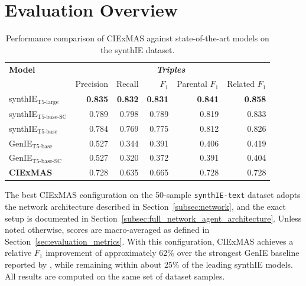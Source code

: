 \documentclass[a4paper,oneside,bibliography=totoc]{scrbook}
\begin{document}
\section{Evaluation Overview}
\label{sec:evaluation_overview}

\begin{table}[h]
  \centering
  \begin{tabular}{l|rrrrr}
    \toprule
    \textbf{Model}                & \multicolumn{5}{c}{\textit{\textbf{Triples}}}                                                                     \\
                                  & Precision                                     & Recall         & $F_1$          & Parental $F_1$ & Related $F_1$  \\
    \midrule
    synthIE$_{\text{T5-large}}$   & \textbf{0.835}                                & \textbf{0.832} & \textbf{0.831} & \textbf{0.841} & \textbf{0.858} \\
    synthIE$_{\text{T5-base-SC}}$ & 0.789                                         & 0.798          & 0.789          & 0.819          & 0.833          \\
    synthIE$_{\text{T5-base}}$    & 0.784                                         & 0.769          & 0.775          & 0.812          & 0.826          \\
    GenIE$_{\text{T5-base}}$      & 0.527                                         & 0.344          & 0.391          & 0.406          & 0.419          \\
    GenIE$_{\text{T5-base-SC}}$   & 0.527                                         & 0.320          & 0.372          & 0.391          & 0.404          \\
    \midrule
    \textbf{CIExMAS}              & 0.728                                         & 0.635          & 0.665          & 0.728          & 0.728          \\
    \bottomrule
  \end{tabular}
  \caption{Performance comparison of CIExMAS against state-of-the-art models on the synthIE dataset.}
  \label{tab:evaluation_overview}
\end{table}

The best CIExMAS configuration on the 50-sample \texttt{synthIE-text} dataset adopts the network architecture described in Section~\ref{subsec:network}, and the exact setup is documented in Section~\ref{subsec:full_network_agent_architecture}. Unless noted otherwise, scores are macro-averaged as defined in Section~\ref{sec:evaluation_metrics}. With this configuration, CIExMAS achieves a relative $F_1$ improvement of approximately 62\% over the strongest GenIE baseline reported by \citet{Josifoski2021}, while remaining within about 25\% of the leading synthIE models. All results are computed on the same set of dataset samples.
\end{document}
